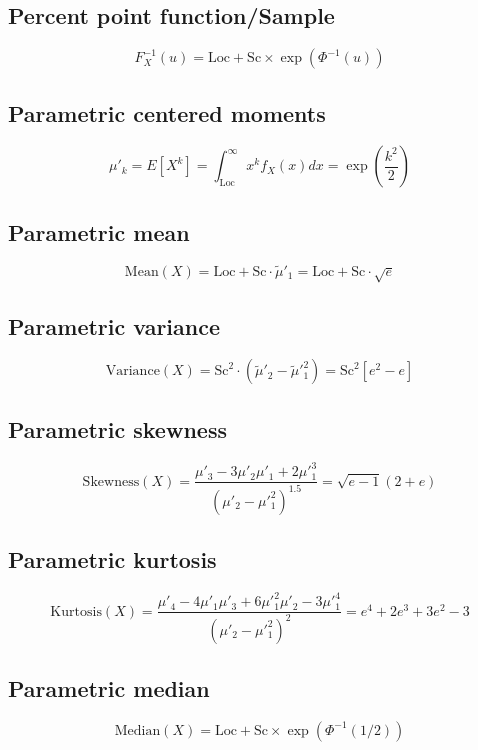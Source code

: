 \documentclass{article}
\begin{document}
\subsection{Percent point function/Sample}
\begin{equation*} F^{-1}_{X}\left(u\right)=\text{Loc}+\text{Sc}\times \exp\left(\Phi^{-1}\left(u\right)\right) \end{equation*}
\subsection{Parametric centered moments}
\begin{equation*} \mu'_{k}=E[X^k]=\int_{\text{Loc}}^{\infty}x^{k}f_{X}\left(x\right)dx=\exp\left(\frac{k^{2}}{2}\right) \end{equation*}
\subsection{Parametric mean}
\begin{equation*} \mathrm{Mean}(X)=\text{Loc}+\text{Sc}\cdot\tilde{\mu}'_{1}=\text{Loc}+\text{Sc}\cdot\sqrt{e} \end{equation*}
\subsection{Parametric variance}
\begin{equation*} \mathrm{Variance}(X)=\text{Sc}^{2}\cdot(\tilde{\mu}'_{2}-\tilde{\mu}'^{2}_{1})=\text{Sc}^{2}\left[e{^2}-e\right] \end{equation*}
\subsection{Parametric skewness}
\begin{equation*} \mathrm{Skewness}(X)=\frac{\mu'_{3}-3\mu'_{2}\mu'_{1}+2\mu'^{3}_{1}}{(\mu'_{2}-\mu'^{2}_{1})^{1.5}}=\sqrt{e-1}\left(2+e\right) \end{equation*}
\subsection{Parametric kurtosis}
\begin{equation*} \mathrm{Kurtosis}(X)=\frac{\mu'_{4}-4\mu'_{1}\mu'_{3}+6\mu'^{2}_{1}\mu'_{2}-3\mu'^{4}_{1}}{(\mu'_{2}-\mu'^{2}_{1})^{2}}=e^{4}+2e^{3}+3e^{2}-3 \end{equation*}
\subsection{Parametric median}
\begin{equation*} \mathrm{Median}(X)=\text{Loc}+\text{Sc}\times \exp\left(\Phi^{-1}\left(1/2\right)\right) \end{equation*}
\end{document}
